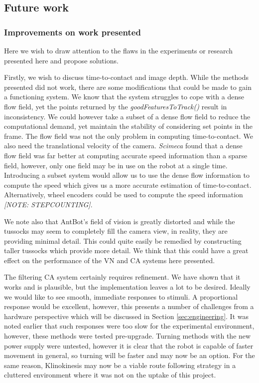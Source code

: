 \documentclass[a4paper,12pt]{article}
\begin{document}
\subsection{Future work}
\subsubsection{Improvements on work presented}
Here we wish to draw attention to the flaws in the experiments or research presented here and propose solutions.
\newline

Firstly, we wish to discuss time-to-contact and image depth. While the methods presented did not work, there are
some modifications that could be made to gain a functioning system. We know that the system struggles to cope
with a dense flow field, yet the points returned by the \textit{goodFeaturesToTrack()} result in inconsistency. We
could however take a subset of a dense flow field to reduce the computational demand, yet maintain the stability of
considering set points in the frame. The flow field was not the only problem in computing time-to-contact. We also
need the translational velocity of the camera. \textit{Scimeca} found that a dense flow field was far better at
computing accurate speed information than a sparse field, however, only one field may be in use on the robot at
a single time. Introducing a subset system would allow us to use the dense flow information to compute the speed
which gives us a more accurate estimation of time-to-contact. Alternatively, wheel encoders could be used to compute the
speed information \textit{[NOTE: STEPCOUNTING]}.
\newline

We note also that AntBot's field of vision is greatly distorted and while the tussocks may seem to completely
fill the camera view, in reality, they are providing minimal detail. This could quite easily be remedied by
constructing taller tussocks which provide more detail. We think that this could have a great effect on the
performance of the VN and CA systems here presented.
\newline

The filtering CA system certainly requires refinement. We have shown that it works and is plausible, but
the implementation leaves a lot to be desired. Ideally we would like to see smooth, immediate responses
to stimuli. A proportional response would be excellent, however, this presents a number of challenges
from a hardware perspective which will be discussed in Section \ref{sec:engineering}. It was noted earlier
that such responses were too slow for the experimental environment, however, these methods were tested
pre-upgrade. Turning methods with the new power supply were untested, however it is clear that the robot
is capable of faster movement in general, so turning will be faster and may now be an option. For the
same reason, Klinokinesis may now be a viable route following strategy in a cluttered environment where
it was not on the uptake of this project.
\newline
\end{document}
